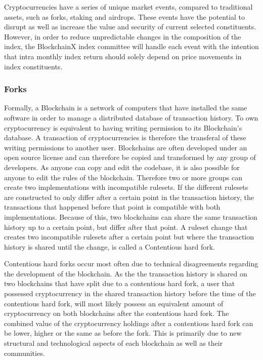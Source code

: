\documentclass{article}
\begin{document}
Cryptocurrencies have a series of unique market events, compared to traditional assets, such as forks, staking and airdrops. These events have the potential to disrupt as well as increase the value and security of current selected constituents. However, in order to reduce unpredictable changes in the composition of the index, the BlockchainX index committee will handle each event with the intention that intra monthly index return should solely depend on price movements in index constituents. 

\subsubsection{Forks}

Formally, a Blockchain is a network of computers that have installed the same software in order to manage a distributed database of transaction history. To own cryptocurrency is equivalent to having writing permission to its Blockchain's database. A transaction of cryptocurrencies is therefore the transferal of these writing permissions to another user. Blockchains are often developed under an open source license and can therefore be copied and transformed by any group of developers. As anyone can copy and edit the codebase, it is also possible for anyone to edit the rules of the blockchain. Therefore two or more groups can create two implementations with incompatible rulesets. If the different rulesets are constructed to only differ after a certain point in the transaction history, the transactions that happened before that point is compatible with both implementations. Because of this, two blockchains can share the same transaction history up to a certain point, but differ after that point. A ruleset change that creates two incompatible rulesets after a certain point but where the transaction history is shared until the change, is called a Contentious hard fork.

Contentious hard forks occur most often due to technical disagreements regarding the development of the blockchain. As the the transaction history is shared on two blockchains that have split due to a contentious hard fork, a user that possessed cryptocurrency in the shared transaction history before the time of the contentious hard fork, will most likely possess an equivalent amount of cryptocurrency on both blockchains after the contentious hard fork. The combined value of the cryptocurrency holdings after a contentious hard fork can be lower, higher or the same as before the fork. This is primarily due to new structural and technological aspects of each blockchain as well as their communities. 
\end{document}

